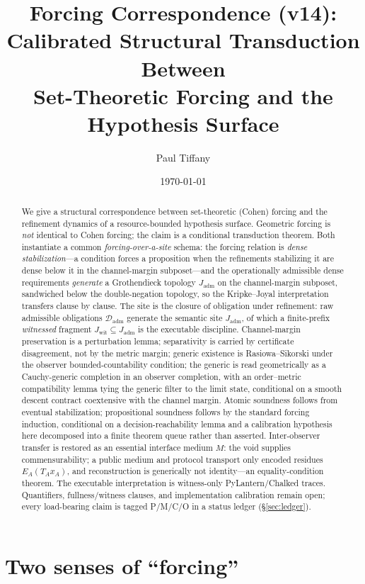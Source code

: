 \documentclass[11pt]{article}
\title{Forcing Correspondence (v14):\\ Calibrated Structural Transduction Between\\
Set-Theoretic Forcing and the Hypothesis Surface}
\author{Paul Tiffany}
\date{\today}
\theoremstyle{definition}
\theoremstyle{remark}
\newcommand{\Dadm}{\mathcal{D}_{\mathrm{adm}}}
\newcommand{\Jadm}{J_{\mathrm{adm}}}
\newcommand{\Jwit}{J_{\mathrm{wit}}}
\begin{document}
\maketitle

\begin{abstract}
We give a structural correspondence between set-theoretic (Cohen) forcing and the refinement
 dynamics of a resource-bounded hypothesis surface. Geometric forcing is \emph{not} identical to
 Cohen forcing; the claim is a conditional transduction theorem. Both instantiate a common
 \emph{forcing-over-a-site} schema: the forcing relation is \emph{dense stabilization}---a condition
 forces a proposition when the refinements stabilizing it are dense below it in the channel-margin
 subposet---and the operationally admissible dense requirements \emph{generate} a Grothendieck
 topology $\Jadm$ on the channel-margin subposet, sandwiched below the double-negation topology, so
 the Kripke--Joyal interpretation transfers clause by clause. The site is the closure of obligation
 under refinement: raw admissible obligations $\Dadm$ generate the semantic site $\Jadm$, of which a
 finite-prefix \emph{witnessed} fragment $\Jwit\subseteq\Jadm$ is the executable discipline.
 Channel-margin preservation is a perturbation lemma; separativity is carried by certificate
 disagreement, not by the metric margin; generic existence is Rasiowa--Sikorski under the observer
 bounded-countability condition; the generic is read geometrically as a Cauchy-generic completion in
 an observer completion, with an order--metric compatibility lemma tying the generic filter to the
 limit state, conditional on a smooth descent contract coextensive with the channel margin. Atomic
 soundness follows from eventual stabilization; propositional soundness follows by the standard
 forcing induction, conditional on a decision-reachability lemma and a calibration hypothesis here
 decomposed into a finite theorem queue rather than asserted. Inter-observer transfer is restored as
 an essential interface medium $M$: the void supplies commensurability; a public medium and protocol
 transport only encoded residues $E_A(T_Ax_A)$, and reconstruction is generically not identity---an
 equality-condition theorem. The executable interpretation is witness-only PyLantern/Chalked traces.
 Quantifiers, fullness/witness clauses, and implementation calibration remain open; every load-bearing
 claim is tagged P/M/C/O in a status ledger (\S\ref{sec:ledger}).
\end{abstract}

\section{Two senses of ``forcing''}
\end{document}
